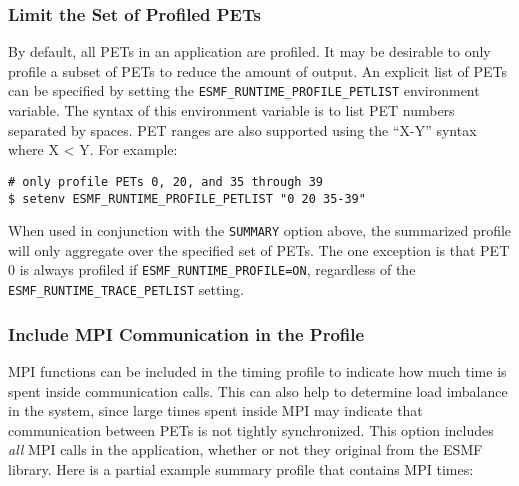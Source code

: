 \subsubsection{Limit the Set of Profiled PETs}
\label{sec:LimitProfiling}

By default, all PETs in an application are profiled. It may be desirable
to only profile a subset of PETs to reduce the amount of output.
An explicit list of PETs can be specified by setting the
{\tt ESMF\_RUNTIME\_PROFILE\_PETLIST} environment variable.
The syntax of this environment variable is to list
PET numbers separated by spaces. PET ranges are also supported using
the ``X-Y'' syntax where X < Y.
For example:

\begin{verbatim}
# only profile PETs 0, 20, and 35 through 39
$ setenv ESMF_RUNTIME_PROFILE_PETLIST "0 20 35-39"
\end{verbatim}

When used in conjunction with the {\tt SUMMARY} option above, the summarized
profile will only aggregate over the specified set of PETs. The one exception is that
PET 0 is always profiled if {\tt ESMF\_RUNTIME\_PROFILE=ON}, regardless of the
{\tt ESMF\_RUNTIME\_TRACE\_PETLIST} setting.


\subsubsection{Include MPI Communication in the Profile}
\label{sec:MPIProfiling}

MPI functions can be included in the timing profile to indicate how much time
is spent inside communication calls.  This can also help to determine load imbalance
in the system, since large times spent inside MPI may indicate that communication
between PETs is not tightly synchronized.  This option includes {\em all} MPI calls in
the application, whether or not they original from the ESMF library.  Here is a partial
example summary profile that contains MPI times:

